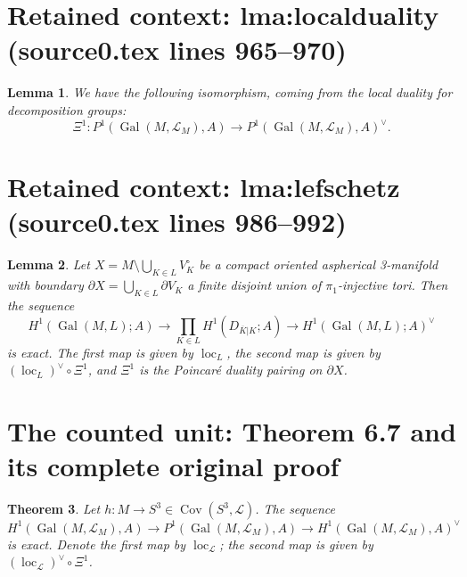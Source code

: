 \documentclass[10pt,a4paper]{amsart}
\DeclareMathOperator{\Cov}{\mathrm{Cov}}
\DeclareMathOperator{\Gal}{\mathrm{Gal}}
\DeclareMathOperator{\loc}{\mathrm{loc}}
\theoremstyle{plain}
\newtheorem{theorem}{Theorem}
\newtheorem{lemma}[theorem]{Lemma}
\theoremstyle{definition}
\theoremstyle{remark}
\begin{document}
\section*{Retained context: lma:localduality (source0.tex lines 965--970)}

\begin{lemma}\label{lma:localduality}
We have the following isomorphism, coming from the local duality for decomposition groups:
\begin{equation}
    \Xi^1: P^1(\Gal(M, \mathcal{L}_M), A) \to P^1(\Gal(M, \mathcal{L}_M), A)^\vee.
\end{equation}
\end{lemma}


\section*{Retained context: lma:lefschetz (source0.tex lines 986--992)}

\begin{lemma}\label{lma:lefschetz}
Let $X = M \setminus \bigcup_{K \in L}V_K^{\circ}$ be a compact oriented aspherical 3-manifold with boundary $\partial X = \bigcup_{K \in L}\partial V_K$ a finite disjoint union of $\pi_1$-injective tori. Then the sequence
\begin{equation}\label{eq:58}
    H^1(\Gal(M, L); A) \to \prod_{K \in L}H^1(D_{\overline{K}|K}; A) \to H^1(\Gal(M, L); A)^\vee
\end{equation}
is exact. The first map is given by $\loc_L$, the second map is given by $(\loc_L)^\vee \circ \Xi^1$, and $\Xi^1$ is the Poincar\'e duality pairing on $\partial X$.
\end{lemma}


\section{The counted unit: Theorem 6.7 and its complete original proof}

\begin{theorem}\label{thm:exact}
Let $h: M \to S^3 \in \Cov(S^3, \mathcal{L})$. The sequence
\begin{equation}
    H^1(\Gal(M, \mathcal{L}_M), A) \to P^1(\Gal(M, \mathcal{L}_M), A) \to H^1(\Gal(M, \mathcal{L}_M), A)^\vee
\end{equation}
is exact. Denote the first map by $\loc_{\mathcal{L}}$; the second map is given by $(\loc_\mathcal{L})^\vee \circ \Xi^1$.
\end{theorem}
\end{document}

